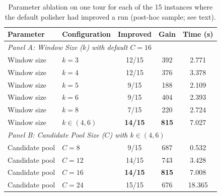 \begin{table}[t]
\centering
\caption{Parameter ablation on one tour for each of the 15 instances where the default polisher had improved a run (post-hoc sample; see text).}
\label{tab:ablation_sensitivity}
\footnotesize\setlength{\tabcolsep}{4pt}
\begin{tabular}{ll ccc}
\toprule
\textbf{Parameter} & \textbf{Configuration} & \textbf{Improved} & \textbf{Gain} & \textbf{Time (s)} \\
\midrule
\multicolumn{5}{l}{\textit{Panel A: Window Size ($k$) with default $C=16$}} \\
Window size & $k=3$ & 12/15 & 392 & 2.771 \\
Window size & $k=4$ & 12/15 & 376 & 3.378 \\
Window size & $k=5$ & 9/15 & 188 & 2.109 \\
Window size & $k=6$ & 9/15 & 404 & 2.393 \\
Window size & $k=8$ & 7/15 & 220 & 2.724 \\
Window size & $k \in (4, 6)$ & \textbf{14/15} & \textbf{815} & 7.027 \\
\midrule
\multicolumn{5}{l}{\textit{Panel B: Candidate Pool Size ($C$) with $k \in (4,6)$}} \\
Candidate pool & $C = 8$ & 9/15 & 687 & 0.532 \\
Candidate pool & $C = 12$ & 14/15 & 743 & 3.428 \\
Candidate pool & $C = 16$ & \textbf{14/15} & \textbf{815} & 7.008 \\
Candidate pool & $C = 24$ & 15/15 & 676 & 18.365 \\
\bottomrule
\end{tabular}
\end{table}
